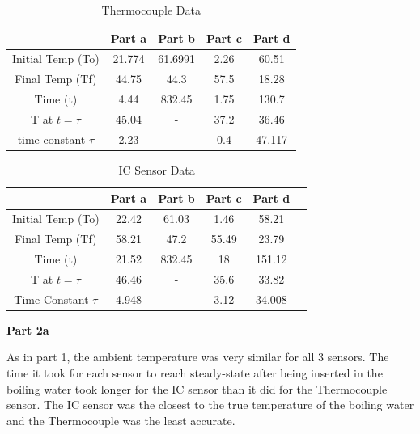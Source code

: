 \documentclass{article}
\begin{document}
\begin{table}[hbtp]
    \centering
    \begin{tabular}{|c|c|c|c|c|}
        \hline
         &  Part a&  Part b&  Part c&  Part d \\
        \hline
         Initial Temp (To)&  21.774&  61.6991&  2.26&  60.51 \\
        \hline
         Final Temp (Tf)&  44.75&  44.3&  57.5&  18.28 \\
        \hline
         Time (t)&  4.44&  832.45&  1.75 &  130.7 \\
        \hline
         T at \(t=\tau\)&  45.04&  - &  37.2&  36.46 \\
        \hline
         time constant \(\tau\)&  2.23&  - & 0.4  &  47.117 \\
        \hline
    \end{tabular}
    \caption{Thermocouple Data}
    \label{tab:sudden_temp}
\end{table}

\begin{table}[hbtp]
    \centering
    \begin{tabular}{|c|c|c|c|c|c|}
        \hline
         &  Part a&  Part b&  Part c&  Part d& \\
        \hline
         Initial Temp (To)&  22.42&  61.03&  1.46&  58.21& \\
        \hline
         Final Temp (Tf)&  58.21&  47.2 &  55.49&  23.79& \\
        \hline
         Time (t)&  21.52&  832.45&  18 &  151.12& \\
        \hline
         T at \(t=\tau\) &  46.46&  - &  35.6&  33.82& \\
        \hline
         Time Constant \(\tau\) &  4.948&  - &  3.12 &  34.008& \\
        \hline
    \end{tabular}
    \caption{IC Sensor Data}
    \label{tab:sudden_temp2}
\end{table}



\textbf{Part 2a}

As in part 1, the ambient temperature was very similar for all 3 sensors.  The time it took for each sensor to reach steady-state after being inserted in the boiling water took longer for the IC sensor than it did for the Thermocouple sensor.  The IC sensor was the closest to the true temperature of the boiling water and the Thermocouple was the least accurate.  %
\end{document}
